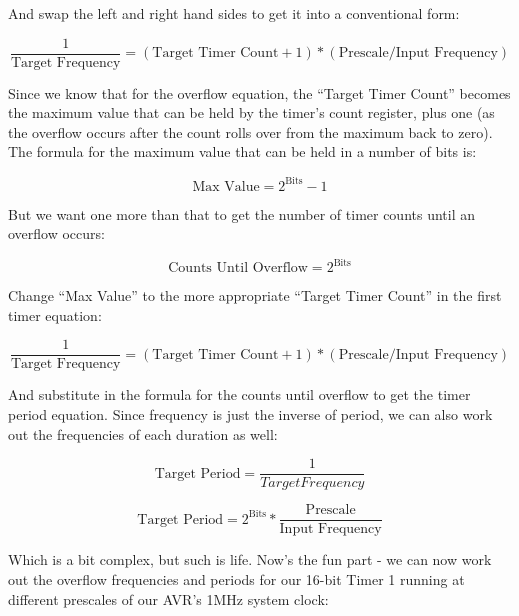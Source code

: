 \documentclass[a4paper,oneside,notitlepage]{book}
\begin{document}
And swap the left and right hand sides to get it into a conventional form:

\begin{displaymath}
\frac{1}{\text{Target Frequency}} = (\text{Target Timer Count} + 1) * (\text{Prescale} / \text{Input Frequency})
\end{displaymath}

Since we know that for the overflow equation, the ``Target Timer Count'' becomes the maximum value that can be held by the timer's count register, plus one (as the overflow occurs after the count rolls over from the maximum back to zero). The formula for the maximum value that can be held in a number of bits is: 

\begin{displaymath}
\text{Max Value} = 2^\text{Bits} - 1 
\end{displaymath}

But we want one more than that to get the number of timer counts until an overflow occurs: 

\begin{displaymath}
\text{Counts Until Overflow} = 2^\text{Bits}
\end{displaymath}

Change ``Max Value'' to the more appropriate ``Target Timer Count'' in the first timer equation:

\begin{displaymath}
\frac{1}{\text{Target Frequency}} = (\text{Target Timer Count} + 1) * (\text{Prescale} / \text{Input Frequency})
\end{displaymath}

And substitute in the formula for the counts until overflow to get the timer period equation. Since frequency is just the inverse of period, we can also work out the frequencies of each duration as well: 

\begin{displaymath}
\text{Target Period} = \frac{1}{Target Frequency}
\end{displaymath}

\begin{displaymath}
\text{Target Period} = 2^\text{Bits} * \frac{\text{Prescale}}{\text{Input Frequency}}
\end{displaymath}

Which is a bit complex, but such is life. Now's the fun part - we can now work out the overflow frequencies and periods for our 16-bit Timer 1 running at different prescales of our AVR's 1MHz system clock:
\end{document}

